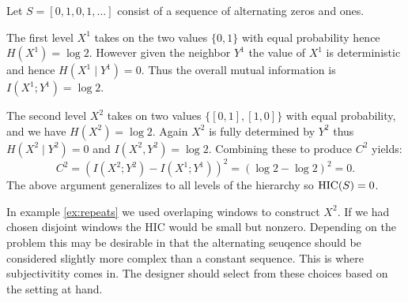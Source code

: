 \begin{example}
  \label{ex:repeats}
  Let $S = [0, 1, 0, 1, \ldots]$ consist of a sequence of alternating zeros and
  ones.

  The first level $X^1$ takes on the two values $\{0, 1\}$ with equal
  probability hence $H(X^1) = \log 2$. However given the neighbor $Y^1$ the
  value of $X^1$ is deterministic and hence $H(X^1 \mid Y^1) = 0$. Thus the
  overall mutual information is $I(X^1; Y^1) = \log 2$.

  The second level $X^2$ takes on two values $\{[0, 1], [1, 0]\}$ with
  equal probability, and we have $H(X^2) = \log 2$. Again $X^2$ is fully
  determined by $Y^2$ thus $H(X^2 \mid Y^2) = 0$ and $I(X^2, Y^2) = \log 2$.
  Combining these to produce $C^2$ yields:
  \begin{equation}
    C^2 = (I(X^2; Y^2) - I(X^1; Y^1))^2 = (\log 2 - \log 2)^2 = 0.
  \end{equation}
  The above argument generalizes to all levels of the hierarchy so $\textup{HIC}(S) = 0$.
\end{example}

In example \ref{ex:repeats} we used overlaping windows to construct $X^2$. If
we had chosen disjoint windows the HIC would be small but nonzero. Depending on
the problem this may be desirable in that the alternating seuqence should be
considered slightly more complex than a constant sequence. This is where
subjectivitity comes in. The designer should select from these choices
based on the setting at hand.
